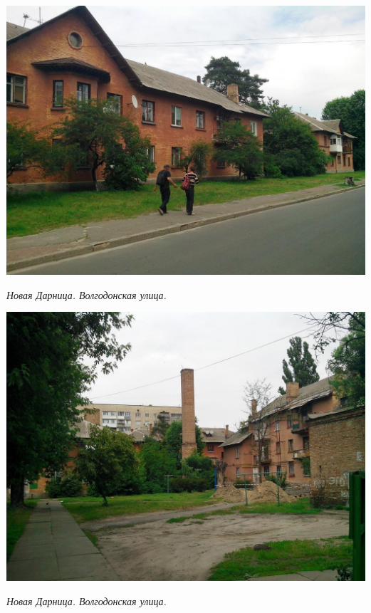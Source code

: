 \begin{center}
\includegraphics[width=\linewidth]{lpix/IMG_20160613_145313.jpg}

\textit{Новая Дарница. Волгодонская улица.}
\end{center}
\newpage


\begin{center}
\includegraphics[width=\linewidth]{lpix/IMG_20160613_145450.jpg}

\textit{Новая Дарница. Волгодонская улица.}
\end{center}


